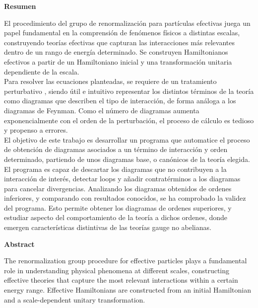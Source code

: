 \documentclass[11pt,a4paper,twoside,pdf]{article}
\numberwithin{equation}{section}
\begin{document}
\newpage
%
\begin{center}
{\bf Resumen}
\bigskip

\begin{minipage}{0.8\linewidth}

El procedimiento del grupo de renormalización para partículas efectivas juega un papel fundamental
en la comprensión de fenómenos físicos a distintas escalas, construyendo teorías efectivas que
capturan las interacciones más relevantes dentro de un rango de energía determinado.
Se construyen Hamiltonianos efectivos a partir de un Hamiltoniano inicial y una transformación
unitaria dependiente de la escala.\\

Para resolver las ecuaciones planteadas, se requiere de un tratamiento perturbativo ,
siendo útil e intuitivo representar los distintos términos de la teoría como diagramas 
que describen el tipo de interacción, de forma análoga a los diagramas de Feynman. Como el número de
diagramas aumenta exponencialmente con el orden de la perturbación,
el proceso de cálculo es tedioso y propenso a errores. \\

El objetivo de este trabajo es desarrollar un programa \cite{Liu_Computational_tools_for_2025} que automatice el proceso
de obtención de diagramas asociados a un término de interacción y orden determinado,
partiendo de unos diagramas base, o canónicos de la 
teoría elegida.\\

El programa es capaz de descartar los diagramas que no contribuyen a la interacción de interés, 
detectar loops y añadir contratérminos a los diagramas para cancelar 
divergencias. Analizando los diagramas obtenidos de ordenes inferiores, y comparando con 
resultados conocidos, se ha comprobado la validez del programa. Esto permite
obtener los diagramas de ordenes superiores, y estudiar aspecto del comportamiento de la 
teoría a dichos ordenes, donde emergen características distintivas de las teorías gauge no abelianas.

\end{minipage}

\newpage

{\bf Abstract} 
\bigskip

\begin{minipage}{0.8\linewidth}
The renormalization group procedure for effective particles plays a fundamental role in understanding
physical phenomena at different scales, constructing effective theories that
capture the most relevant interactions within a certain energy range.
Effective Hamiltonians are constructed from an initial Hamiltonian and a scale-dependent
unitary transformation.\\


\end{minipage}
\end{center}
\end{document}
